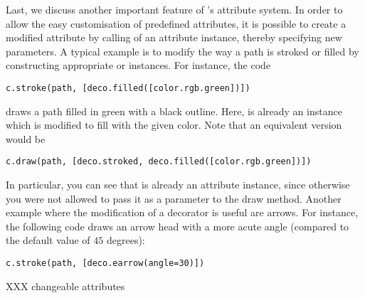 Last, we discuss another important feature of \PyX's attribute system.
In order to allow the easy customisation of predefined attributes, it
is possible to create a modified attribute by calling of an attribute
instance, thereby specifying new parameters. A typical example is to
modify the way a path is stroked or filled by constructing appropriate
 or  instances.
For instance, the code
\begin{verbatim}
c.stroke(path, [deco.filled([color.rgb.green])])
\end{verbatim}
draws a path filled in green with a black outline. Here,
 is already an instance which is modified to fill 
with the given color. Note that an equivalent version would
be
\begin{verbatim}
c.draw(path, [deco.stroked, deco.filled([color.rgb.green])])
\end{verbatim}
In particular, you can see that  is already an
attribute instance, since otherwise you were not allowed to pass
it as a parameter to the draw method. Another example where 
the modification of a decorator is useful are arrows. For instance, the following
code draws an arrow head with a more acute angle (compared to the
default value of $45$ degrees):
\begin{verbatim}
c.stroke(path, [deco.earrow(angle=30)])
\end{verbatim}


XXX changeable attributes
